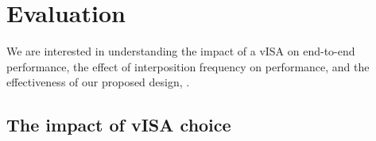
\section{Evaluation}
\label{sec:trilliumeval}


We are interested in understanding the impact of a vISA on end-to-end performance, the effect of interposition frequency on performance, and the effectiveness of our proposed design, \Trillium.

\subsection{The impact of vISA choice}





